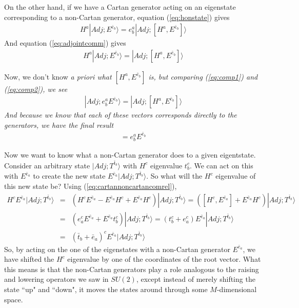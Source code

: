 \documentclass[12pt,epsf]{article}
\def\nolabel{\nonumber }
\def\nolabel{\nonumber }
\begin{document}
On the other hand, if we have a Cartan generator acting on an
eigenstate corresponding to a non-Cartan generator, equation
(\ref{eq:honstate}) gives
\begin{eqnarray}
H^a|Adj;E^{\bar e_b}\rangle = e^a_b|Adj;[H^a,E^{\bar e_b}]\rangle
\label{eq:comp1}
\end{eqnarray}
And equation (\ref{eq:adjointcomm}) gives 
\begin{eqnarray}
H^a|Adj;E^{\bar e_b}\rangle = |Adj;[H^a,E^{\bar e_b}]\rangle
\label{eq:comp2}
\end{eqnarray}

Now, we don't know \it a priori \rm what $[H^a,E^{\bar e_b}]$ is, but
comparing (\ref{eq:comp1}) and (\ref{eq:comp2}), we see
\begin{eqnarray}
|Adj;e^a_bE^{\bar e_b}\rangle = |Adj;[H^a,E^{\bar e_b}]\rangle\nolabel
\end{eqnarray}
And because we know that each of these vectors corresponds directly to
the generators, we have the final result 
\begin{eqnarray}
[H^a,E^{\bar e_b}] = e^a_bE^{\bar e_b} \label{eq:cartannoncartancomrel}
\end{eqnarray}

Now we want to know what a non-Cartan generator does to a given
eigentstate.  Consider an arbitrary state $|Adj;T^{\bar t_b}\rangle$
with $H^c$ eigenvalue $t^c_b$.	We can act on this with $E^{\bar e_a}$
to create the new state $E^{\bar e_a}|Adj;T^{\bar t_b}\rangle$.  So
what will the $H^c$ eigenvalue of this new state be?  Using
(\ref{eq:cartannoncartancomrel}),
\begin{eqnarray}
H^cE^{\bar e_a}|Adj;T^{\bar t_b}\rangle &=& (H^cE^{\bar e_a} - E^{\bar
e_a}H^c+E^{\bar e_a}H^c)|Adj;T^{\bar t_b}\rangle =  ([H^c,E^{\bar
e_a}]+E^{\bar e_a}H^c)|Adj;T^{\bar t_b}\rangle \nolabel \\
&=& (e^c_aE^{\bar e_a}+E^{\bar e_a}t^c_b)|Adj;T^{\bar t_b}\rangle =
(t^c_b+e^c_a)E^{\bar e_a}|Adj;T^{\bar t_b}\rangle \nolabel \\
&=& (\bar t_b+\bar e_a)^cE^{\bar e_a}|Adj;T^{\bar t_b}\rangle
\label{eq:addrootvectors}
\end{eqnarray}
So, by acting on the one of the eigenstates with a non-Cartan generator
$E^{\bar e_a}$, we have shifted the $H^c$ eigenvalue by one of the
coordinates of the root vector.  What this means is that the non-Cartan
generators play a role analogous to the raising and lowering operators we
saw in $SU(2)$, except instead of merely shifting the state ``up" and
``down", it moves the states around through some $M$-dimensional space. 
\end{document}
